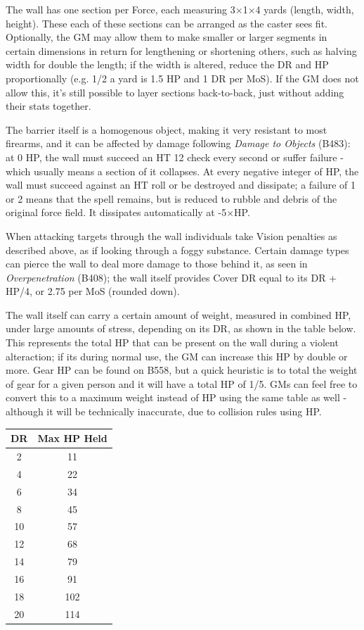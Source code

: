 \begin{multicols*}{3}
	The wall has one section per Force, each measuring 3$\times$1$\times$4 yards (length, width, height). These each of these sections can be arranged as the caster sees fit. Optionally, the GM may allow them to make smaller or larger segments in certain dimensions in return for lengthening or shortening others, such as halving width for double the length; if the width is altered, reduce the DR and HP proportionally (e.g. 1/2 a yard is 1.5 HP and 1 DR per MoS). If the GM does not allow this, it's still possible to layer sections back-to-back, just without adding their stats together.
	
	The barrier itself is a homogenous object, making it very resistant to most firearms, and it can be affected by damage following \textit{Damage to Objects} (B483): at 0 HP, the wall must succeed an HT 12 check every second or suffer failure - which usually means a section of it collapses. At every negative integer of HP, the wall must succeed against an HT roll or be destroyed and dissipate; a failure of 1 or 2 means that the spell remains, but is reduced to rubble and debris of the original force field. It dissipates automatically at -5$\times$HP.
	
	When attacking targets through the wall individuals take Vision penalties as described above, as if looking through a foggy substance. Certain damage types can pierce the wall to deal more damage to those behind it, as seen in \textit{Overpenetration} (B408); the wall itself provides Cover DR equal to its DR + HP/4, or 2.75 per MoS (rounded down).
	
	The wall itself can carry a certain amount of weight, measured in combined HP, under large amounts of stress, depending on its DR, as shown in the table below. This represents the total HP that can be present on the wall during a violent alteraction; if its during normal use, the GM can increase this HP by double or more. Gear HP can be found on B558, but a quick heuristic is to total the weight of gear for a given person and it will have a total HP of 1/5. GMs can feel free to convert this to a maximum weight instead of HP using the same table as well - although it will be technically inaccurate, due to collision rules using HP.
	
	\begin{center}
		\begin{tabular}{|c|c|}
			\hline
			DR & Max HP Held \\
			\hline
			\hline
			2 & 11 \\
			4 & 22 \\
			6 & 34 \\
			8 & 45 \\
			10 & 57 \\
			12 & 68 \\
			14 & 79 \\
			16 & 91 \\
			18 & 102 \\
			20 & 114 \\
			\hline
		\end{tabular}
	\end{center}	
		

\end{multicols*}
